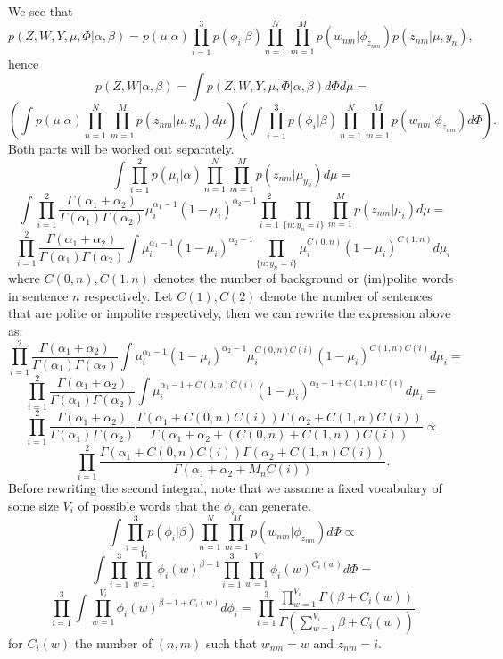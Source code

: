 \documentclass[11pt, english]{article}
\begin{document}
We see that
\[
p(Z,W,Y,\mu,\Phi|\alpha,\beta)=p(\mu |\alpha) \prod_{i=1}^3 p(\phi_i|\beta) \prod_{n=1}^N  \prod_{m=1}^M p(w_{nm}|\phi_{z_{nm}})p(z_{nm}|\mu,y_n),
\]
hence
\[
p(Z,W|\alpha,\beta)=\int p(Z,W,Y,\mu,\Phi|\alpha,\beta) d\Phi d\mu =
\]
\[
\left(\int p(\mu |\alpha)\prod_{n=1}^N  \prod_{m=1}^M p(z_{nm}|\mu,y_n)d\mu \right) \left( \int \prod_{i=1}^3 p(\phi_i|\beta) \prod_{n=1}^N  \prod_{m=1}^M p(w_{nm}|\phi_{z_{nm}}) d\Phi \right).
\]
Both parts will be worked out separately. 
\[
\int \prod_{i=1}^2 p(\mu_i |\alpha)\prod_{n=1}^N  \prod_{m=1}^M p(z_{nm}|\mu_{y_n})d\mu=
\]
\[
\int \prod_{i=1}^2 \frac{\Gamma(\alpha_1+\alpha_2)}{\Gamma(\alpha_1)\Gamma(\alpha_2)} \mu_{i}^{\alpha_1-1}(1-\mu_{i})^{\alpha_2-1} \prod_{i=1}^2 \prod_{\{n:y_n=i\}}  \prod_{m=1}^M p(z_{nm}|\mu_{i})d\mu=
\]
\[
\prod_{i=1}^2  \frac{\Gamma(\alpha_1+\alpha_2)}{\Gamma(\alpha_1)\Gamma(\alpha_2)} \int  \mu_{i}^{\alpha_1-1}(1-\mu_{i})^{\alpha_2-1} \prod_{\{n:y_n=i\}} \mu_i^{C(0,n)}(1-\mu_i)^{C(1,n)}d\mu_i
\]
where $C(0,n),C(1,n)$ denotes the number of background or (im)polite words in sentence $n$ respectively. Let $C(1),C(2)$ denote the number of sentences that are polite or impolite respectively, then we can rewrite the expression above as:
\[
\prod_{i=1}^2  \frac{\Gamma(\alpha_1+\alpha_2)}{\Gamma(\alpha_1)\Gamma(\alpha_2)}
\int  \mu_{i}^{\alpha_1-1}(1-\mu_{i})^{\alpha_2-1} \mu_i^{C(0,n)C(i)}(1-\mu_i)^{C(1,n)C(i)}d\mu_i=
\]
\[
\prod_{i=1}^2  \frac{\Gamma(\alpha_1+\alpha_2)}{\Gamma(\alpha_1)\Gamma(\alpha_2)}
\int  \mu_{i}^{\alpha_1-1+C(0,n)C(i)}(1-\mu_{i})^{\alpha_2-1+C(1,n)C(i)}d\mu_i=
\]
\[
\prod_{i=1}^2  \frac{\Gamma(\alpha_1+\alpha_2)}{\Gamma(\alpha_1)\Gamma(\alpha_2)} \frac{\Gamma(\alpha_1+C(0,n)C(i))\Gamma(\alpha_2+C(1,n)C(i))}{\Gamma(\alpha_1+\alpha_2+(C(0,n)+C(1,n))C(i))}\propto
\]
\[
\prod_{i=1}^2 \frac{\Gamma(\alpha_1+C(0,n)C(i))\Gamma(\alpha_2+C(1,n)C(i))}{\Gamma(\alpha_1+\alpha_2+M_nC(i))}.
\]
Before rewriting the second integral, note that we assume a fixed vocabulary of some size $V_i$ of possible words that the $\phi_i$ can generate.
\[
\int \prod_{i=1}^3 p(\phi_i|\beta) \prod_{n=1}^N  \prod_{m=1}^M p(w_{nm}|\phi_{z_{nm}}) d\Phi \propto
\]
\[
\int \prod_{i=1}^3 \prod_{w=1}^{V_i}\phi_i(w)^{\beta-1} \prod_{i=1}^3 \prod_{w=1}^V \phi_i(w)^{C_i(w)} d\Phi=
\]
\[
 \prod_{i=1}^3 \int \prod_{w=1}^{V_i} \phi_i(w)^{\beta-1+C_i(w)} d\phi_i= \prod_{i=1}^3 \frac{\prod_{w=1}^{V_i}\Gamma(\beta+C_i(w))}{\Gamma(\sum_{w=1}^{V_i}\beta+C_i(w))}
\]
for $C_i(w)$ the number of $(n,m)$ such that $w_{nm}=w$ and $z_{nm}=i$.
\end{document}
